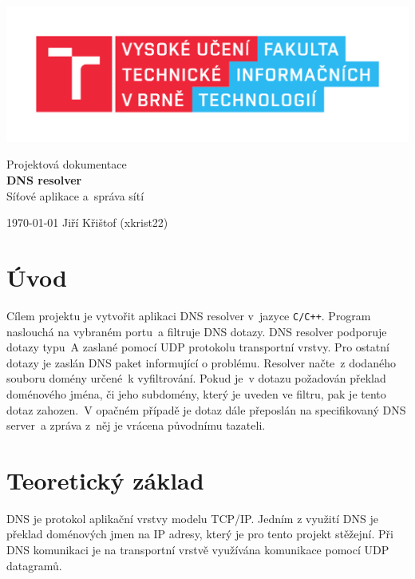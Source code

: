 \documentclass[a4paper, 11pt]{article}
\begin{document}
	\begin{titlepage}
		\begin{center}
			\includegraphics[width=0.77\linewidth]{FIT_logo.pdf} \\


			\Huge{Projektová dokumentace} \\
			\LARGE{\textbf{
				DNS resolver
			}} \\
			\Large{Síťové aplikace a~správa sítí}

		\end{center}

		{\Large
			\today
			\hfill
			Jiří Křištof (xkrist22)
		}
	\end{titlepage}
	
	\setcounter{tocdepth}{1}
	\thispagestyle{empty}
	\tableofcontents
	\clearpage
	
	\setcounter{page}{1}

	\section{Úvod}
	Cílem projektu je vytvořit aplikaci DNS resolver v~jazyce \texttt{C/C++}. Program naslouchá na vybraném portu~a filtruje DNS dotazy. DNS resolver podporuje dotazy typu~A zaslané pomocí UDP protokolu transportní vrstvy. Pro ostatní dotazy je zaslán DNS paket informující o problému.
	Resolver načte~z dodaného souboru domény určené~k vyfiltrování. Pokud je~v dotazu požadován překlad doménového jména, či jeho subdomény, který je uveden ve filtru, pak je tento dotaz zahozen.~V opačném případě je dotaz dále přeposlán na specifikovaný DNS server~a zpráva z~něj je vrácena původnímu tazateli.

	\section{Teoretický základ}
	DNS je protokol aplikační vrstvy modelu TCP/IP. Jedním z využití DNS je překlad doménových jmen na IP adresy, který je pro tento projekt stěžejní. Při DNS komunikaci je na transportní vrstvě využívána komunikace pomocí UDP datagramů. 
	
\end{document}
